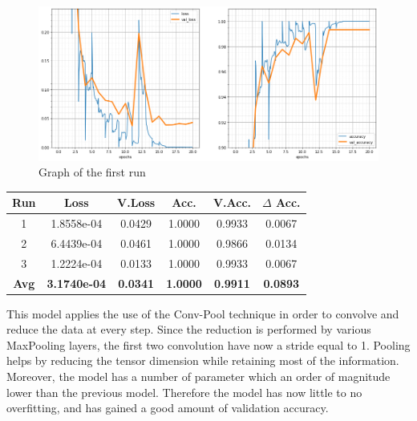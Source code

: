 \begin{figure}[H]
	\begin{center}
	\includegraphics[width=\linewidth]{Immagini/conv-pool-1}
	\caption{Graph of the first run}
	\end{center}
\end{figure}
\begin{table}[H]
	\centering
	\begin{tabular}{cccccc}
		\textbf{Run} &\textbf{Loss}&\textbf{V.Loss} &\textbf{Acc.}&\textbf{V.Acc.}&\textbf{$\Delta$ Acc.} \\ \hline
		1   & 1.8558e-04 &  0.0429  & 1.0000    & 0.9933    & 0.0067\\
		2   & 6.4439e-04 &  0.0461  & 1.0000    & 0.9866    & 0.0134\\
		3   & 1.2224e-04 &  0.0133  & 1.0000    & 0.9933    & 0.0067\\
		\textbf{Avg} & \textbf{3.1740e-04} &  \textbf{0.0341}  & \textbf{1.0000}    & \textbf{0.9911}    & \textbf{0.0893}
	\end{tabular}
\end{table}

This model applies the use of the Conv-Pool technique in order to convolve and reduce the data at every step. Since the reduction is performed by various MaxPooling layers, the first two convolution have now a stride equal to 1. Pooling helps by reducing the tensor dimension while retaining most of the information. 
Moreover, the model has a number of parameter which an order of magnitude lower than the previous model. Therefore the model has now little to no overfitting, and has gained a good amount of validation accuracy.